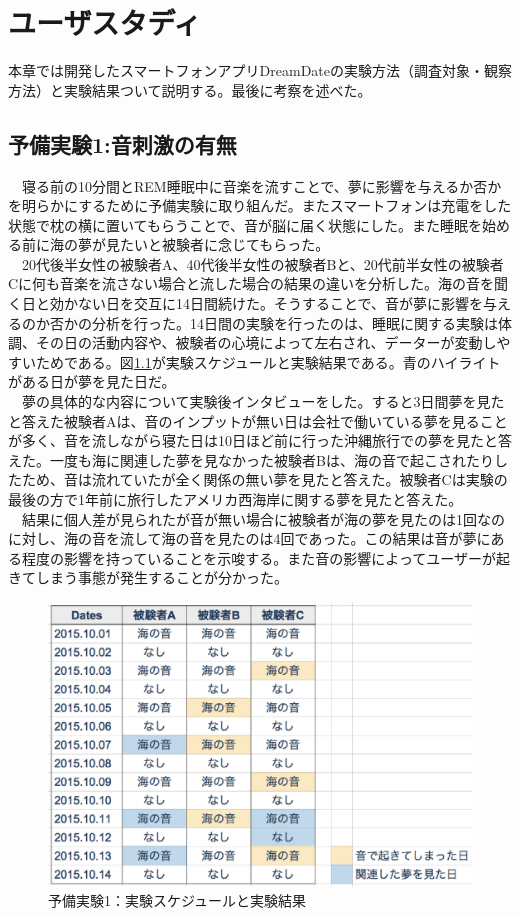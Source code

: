 \chapter{ユーザスタディ}
\label{chap:visualize}

本章では開発したスマートフォンアプリDreamDateの実験方法（調査対象・観察方法）と実験結果ついて説明する。最後に考察を述べた。

\section{予備実験1:音刺激の有無}
　寝る前の10分間とREM睡眠中に音楽を流すことで、夢に影響を与えるか否かを明らかにするために予備実験に取り組んだ。またスマートフォンは充電をした状態で枕の横に置いてもらうことで、音が脳に届く状態にした。また睡眠を始める前に海の夢が見たいと被験者に念じてもらった。\\
　20代後半女性の被験者A、40代後半女性の被験者Bと、20代前半女性の被験者Cに何も音楽を流さない場合と流した場合の結果の違いを分析した。海の音を聞く日と効かない日を交互に14日間続けた。そうすることで、音が夢に影響を与えるのか否かの分析を行った。14日間の実験を行ったのは、睡眠に関する実験は体調、その日の活動内容や、被験者の心境によって左右され、データーが変動しやすいためである。図\ref{experiment1}が実験スケジュールと実験結果である。青のハイライトがある日が夢を見た日だ。\\
　夢の具体的な内容について実験後インタビューをした。すると3日間夢を見たと答えた被験者Aは、音のインプットが無い日は会社で働いている夢を見ることが多く、音を流しながら寝た日は10日ほど前に行った沖縄旅行での夢を見たと答えた。一度も海に関連した夢を見なかった被験者Bは、海の音で起こされたりしたため、音は流れていたが全く関係の無い夢を見たと答えた。被験者Cは実験の最後の方で1年前に旅行したアメリカ西海岸に関する夢を見たと答えた。\\
　結果に個人差が見られたが音が無い場合に被験者が海の夢を見たのは1回なのに対し、海の音を流して海の音を見たのは4回であった。この結果は音が夢にある程度の影響を持っていることを示唆する。また音の影響によってユーザーが起きてしまう事態が発生することが分かった。

\begin{figure}[htbp]
\begin{center}
\includegraphics[width=13cm]{eps/schedule0.eps}
\caption{予備実験1：実験スケジュールと実験結果}
\label{experiment1}
\end{center}
\end{figure}

